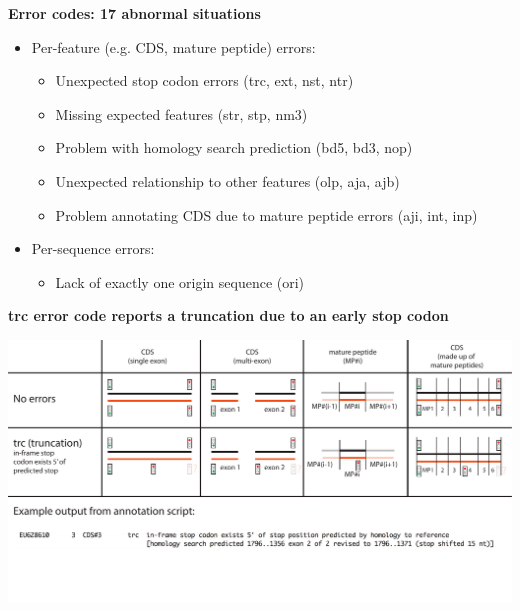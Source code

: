 \documentclass[landscape]{slides}
\begin{document}
\begin{slide}
\begin{center}
\textbf{Error codes: 17 abnormal situations}

\small
\begin{itemize}
\item Per-feature (e.g. CDS, mature peptide) errors:
\begin{itemize}
\item Unexpected stop codon errors (trc, ext, nst, ntr)
\item Missing expected features (str, stp, nm3)
\item Problem with homology search prediction (bd5, bd3, nop)
\item Unexpected relationship to other features (olp, aja, ajb)
\item Problem annotating CDS due to mature peptide errors (aji, int, inp)
\end{itemize}
\item Per-sequence errors:
\begin{itemize} 
\item Lack of exactly one origin sequence (ori)
\end{itemize}
\end{itemize}

\end{center}
\vfill
\end{slide}
\begin{slide}
\begin{center}
\textbf{trc error code reports a truncation due to an early stop codon}
\vspace{0.5in}

\includegraphics[width=10in]{figs/errornew-1-trc}
\end{center}
\vfill
\end{slide}
\end{document}
